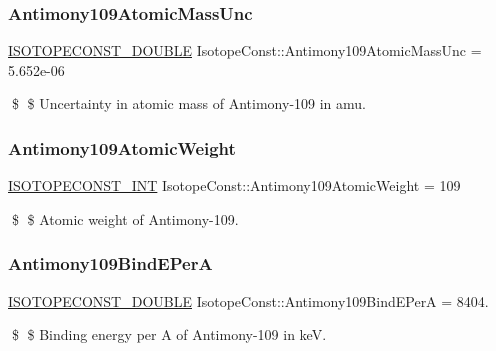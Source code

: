 \subsubsection{\texorpdfstring{Antimony109\+Atomic\+Mass\+Unc}{Antimony109AtomicMassUnc}}
{\footnotesize\ttfamily \mbox{\hyperlink{group___isotope_const-_macros_ga8f45a7272ce02c0b4c65c44636ed719a}{I\+S\+O\+T\+O\+P\+E\+C\+O\+N\+S\+T\+\_\+\+D\+O\+U\+B\+LE}} Isotope\+Const\+::\+Antimony109\+Atomic\+Mass\+Unc = 5.\+652e-\/06}

\$ \$ Uncertainty in atomic mass of Antimony-\/109 in amu. \mbox{\label{group___isotope_const-_antimony-_sb109_ga56aa13bf3d0559f9d2cc09cb59a46014}} 
\subsubsection{\texorpdfstring{Antimony109\+Atomic\+Weight}{Antimony109AtomicWeight}}
{\footnotesize\ttfamily \mbox{\hyperlink{group___isotope_const-_macros_ga5f18360b3e99483a35c32d789e62621c}{I\+S\+O\+T\+O\+P\+E\+C\+O\+N\+S\+T\+\_\+\+I\+NT}} Isotope\+Const\+::\+Antimony109\+Atomic\+Weight = 109}

\$ \$ Atomic weight of Antimony-\/109. \mbox{\label{group___isotope_const-_antimony-_sb109_ga483110d1c78e16aa58559047acc18207}} 
\subsubsection{\texorpdfstring{Antimony109\+Bind\+E\+PerA}{Antimony109BindEPerA}}
{\footnotesize\ttfamily \mbox{\hyperlink{group___isotope_const-_macros_ga8f45a7272ce02c0b4c65c44636ed719a}{I\+S\+O\+T\+O\+P\+E\+C\+O\+N\+S\+T\+\_\+\+D\+O\+U\+B\+LE}} Isotope\+Const\+::\+Antimony109\+Bind\+E\+PerA = 8404.}

\$ \$ Binding energy per A of Antimony-\/109 in keV. \mbox{\label{group___isotope_const-_antimony-_sb109_ga0364c5790ef443e9354c249fc36ff3f9}} 
